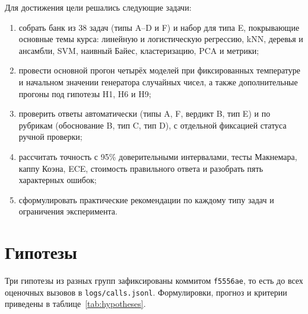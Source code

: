 \documentclass{bmstu}
\begin{document}
Для достижения цели решались следующие задачи:
\begin{enumerate}[label=\arabic*), leftmargin=1.425\parindent, itemsep=0pt, topsep=-\parskip, wide=1.2cm]
\item собрать банк из 38 задач (типы A--D и F) и набор для типа E, покрывающие основные темы курса: линейную и логистическую регрессию, kNN, деревья и ансамбли, SVM, наивный Байес, кластеризацию, PCA и метрики;
\item провести основной прогон четырёх моделей при фиксированных температуре и начальном значении генератора случайных чисел, а также дополнительные прогоны под гипотезы H1, H6 и H9;
\item проверить ответы автоматически (типы A, F, вердикт B, тип E) и по рубрикам (обоснование B, тип C, тип D), с отдельной фиксацией статуса ручной проверки;
\item рассчитать точность с 95\% доверительными интервалами, тесты Макнемара, каппу Коэна, ECE, стоимость правильного ответа и разобрать пять характерных ошибок;
\item сформулировать практические рекомендации по каждому типу задач и ограничения эксперимента.
\end{enumerate}

\section*{Гипотезы}
Три гипотезы из разных групп зафиксированы коммитом \texttt{f5556ae}, то есть до всех оценочных вызовов в \texttt{logs/calls.jsonl}. Формулировки, прогноз и критерии приведены в таблице~\ref{tab:hypotheses}.
\end{document}
